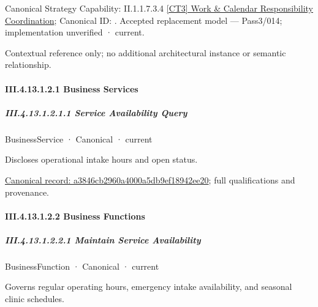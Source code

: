 {\small Canonical Strategy Capability: II.1.1.7.3.4 \hyperref[element:8ead6499039b4a9ea14beeae7d0ff6f4]{[CT3] Work \& Calendar Responsibility Coordination}; Canonical ID: \texttt{}. Accepted replacement model — Pass3/014; implementation unverified · current.}\par
Contextual reference only; no additional architectural instance or semantic relationship.\par
\paragraph*{III.4.13.1.2.1 Business Services}
\label{navigation:III.4.13.1.2.1}

\subparagraph*{III.4.13.1.2.1.1 Service Availability Query}
\label{navigation:III.4.13.1.2.1.1}

\label{element:a3846cb2960a4000a5db9ef18942ee20}
{\small BusinessService · Canonical · current}\par

Discloses operational intake hours and open status.


{\footnotesize \href{../../../../continuum/business/business-service/a3846cb2960a4000a5db9ef18942ee20.md}{Canonical record: a3846cb2960a4000a5db9ef18942ee20}; full qualifications and provenance.}\par
\paragraph*{III.4.13.1.2.2 Business Functions}
\label{navigation:III.4.13.1.2.2}

\subparagraph*{III.4.13.1.2.2.1 Maintain Service Availability}
\label{navigation:III.4.13.1.2.2.1}

\label{element:38321dd2581b46a182dcdf52865d44be}
{\small BusinessFunction · Canonical · current}\par

Governs regular operating hours, emergency intake availability, and seasonal clinic schedules.


